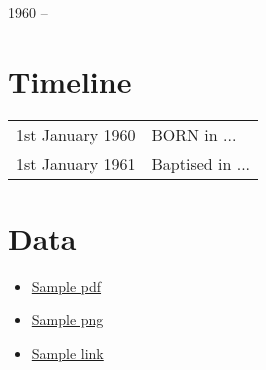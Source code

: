 \begin{center}
\huge{1960 --}
\end{center}

\vspace{1in}

\begin{center}
\end{center}

\newpage
\section{Timeline}
\begin{table}[h]
\renewcommand\arraystretch{1.4}
\begin{tabular}{@{\,}r <{\hskip 2pt} !{\foo} >{\raggedright\arraybackslash}p{20cm}}
\addlinespace[1.5ex]
1st January 1960 & BORN in ...\\
1st January 1961 & Baptised in ... \\
\end{tabular}
\end{table}

\section{Data}
\begin{itemize}
\item \href{run:people/Child1/sample.pdf}{Sample pdf}
\item \href{run:people/Child1/sample.png}{Sample png}
\item \href{https://github.com/StevenElsworth?tab=repositories}{Sample link} 
\end{itemize}